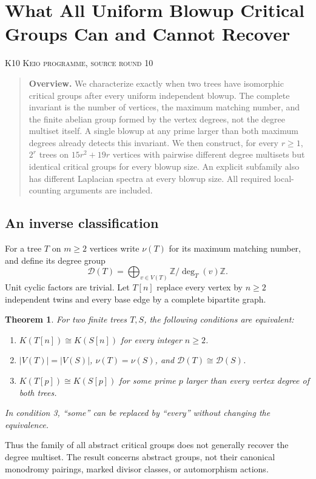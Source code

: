 \documentclass[11pt,a4paper]{article}
\newtheorem{theorem}{Theorem}[section]
\theoremstyle{definition}\newtheorem{definition}[theorem]{Definition}
\theoremstyle{remark}\newtheorem{remark}[theorem]{Remark}
\newcommand{\Z}{\mathbb Z}\newcommand{\Q}{\mathbb Q}\newcommand{\F}{\mathbb F}
\numberwithin{equation}{section}
\begin{document}
\clearpage
\section[K10 --- What All Uniform Blowup Critical Groups Can and Cannot Recover]{What All Uniform Blowup Critical Groups Can and Cannot Recover}\label{contrib-K10}
\noindent\textsc{K10 \quad Keio programme, source round 10}\par\medskip


\begin{quote}\small\textbf{Overview.} We characterize exactly when two trees have isomorphic critical groups after every uniform independent blowup. The complete invariant is the number of vertices, the maximum matching number, and the finite abelian group formed by the vertex degrees, not the degree multiset itself. A single blowup at any prime larger than both maximum degrees already detects this invariant. We then construct, for every $r\geq1$, $2^r$ trees on $15r^2+19r$ vertices with pairwise different degree multisets but identical critical groups for every blowup size. An explicit subfamily also has different Laplacian spectra at every blowup size. All required local-counting arguments are included.\end{quote}

\subsection{An inverse classification}\label{K10-sec-1}
For a tree $T$ on $m\geq2$ vertices write $\nu(T)$ for its maximum matching number, and define its degree group
\[
 \mathcal D(T)=\bigoplus_{v\in V(T)}\Z/\deg_T(v)\Z.
\]
Unit cyclic factors are trivial. Let $T[n]$ replace every vertex by $n\geq2$ independent twins and every base edge by a complete bipartite graph.
\begin{theorem}\label{K10-inverse}
For two finite trees $T,S$, the following conditions are equivalent:
\begin{enumerate}
\item $K(T[n])\cong K(S[n])$ for every integer $n\geq2$.
\item $|V(T)|=|V(S)|$, $\nu(T)=\nu(S)$, and $\mathcal D(T)\cong\mathcal D(S)$.
\item $K(T[p])\cong K(S[p])$ for some prime $p$ larger than every vertex degree of both trees.
\end{enumerate}
In condition 3, ``some'' can be replaced by ``every'' without changing the equivalence.
\end{theorem}
Thus the family of all abstract critical groups does not generally recover the degree multiset. The result concerns abstract groups, not their canonical monodromy pairings, marked divisor classes, or automorphism actions.
\end{document}
